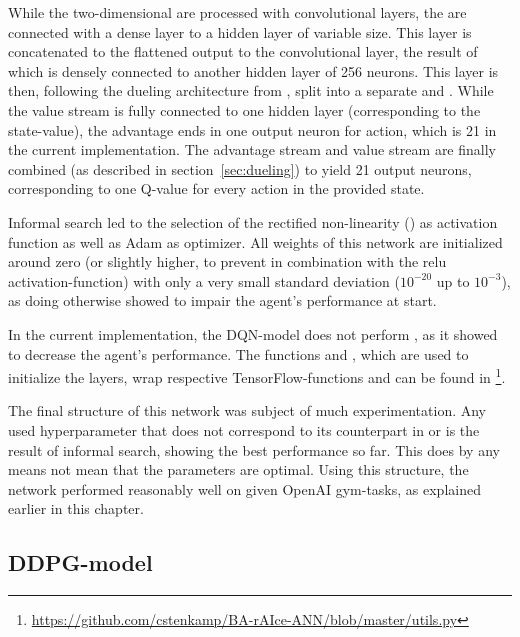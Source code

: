 While the two-dimensional  are processed with convolutional layers, the  are connected with a dense layer to a hidden layer of variable size. This layer is concatenated to the flattened output to the convolutional layer, the result of which is densely connected to another hidden layer of 256 neurons. This layer is then, following the dueling architecture from \cite{wang_dueling_2015}, split into a separate  and . While the value stream is fully connected to one hidden layer (corresponding to the state-value), the advantage ends in one output neuron for action, which is 21 in the current implementation. The advantage stream and value stream are finally combined (as described in section~\ref{sec:dueling}) to yield 21 output neurons, corresponding to one Q-value for every action in the provided state.

Informal search led to the selection of the rectified non-linearity () as activation function as well as Adam\cite{kingma_adam:_2014} as optimizer. All weights of this network are initialized around zero (or slightly higher, to prevent  in combination with the relu activation-function) with only a very small standard deviation ($10^{-20}$ up to $10^{-3}$), as doing otherwise showed to impair the agent's performance at start.

In the current implementation, the DQN-model does not perform \cite{ioffe_batch_2015}, as it showed to decrease the agent's performance. The functions  and , which are used to initialize the layers, wrap respective TensorFlow-functions and can be found in \footnote{\url{https://github.com/cstenkamp/BA-rAIce-ANN/blob/master/utils.py}}.

The final structure of this network was subject of much experimentation. Any used hyperparameter that does not correspond to its counterpart in \cite{mnih_human-level_2015} or \cite{wang_dueling_2015} is the result of informal search, showing the best performance so far. This does by any means not mean that the parameters are optimal. Using this structure, the network performed reasonably well on given OpenAI gym-tasks, as explained earlier in this chapter.


\subsection{DDPG-model}

